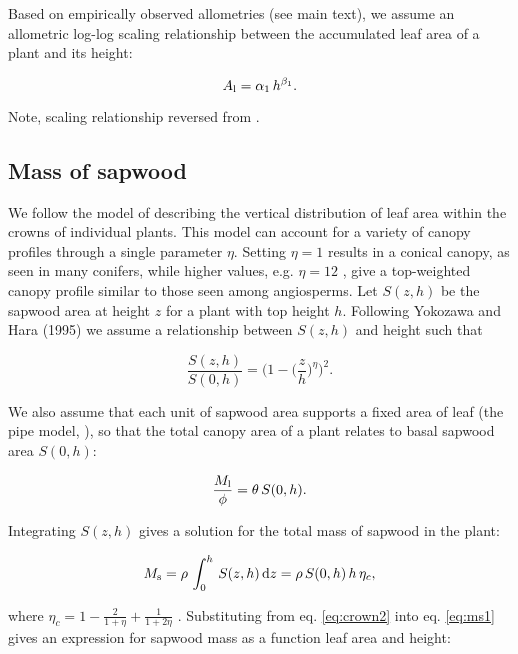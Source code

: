 \documentclass[12pt, a4paper]{article}
\begin{document}
\begin{appendices}
Based on empirically observed allometries (see main text), we assume an
allometric log-log scaling relationship between the accumulated leaf
area of a plant and its height:

\begin{equation}\label{eq:ha}
A_{\rm l}=\alpha_1 \, h^{\beta_1}.
\end{equation}

Note, scaling relationship reversed from \citep{falster-2011}.

\subsection{Mass of sapwood}\label{mass-of-sapwood}

We follow the model of \citep{yokozawa-1995} describing the
vertical distribution of leaf area within the crowns of individual
plants. This model can account for a variety of canopy profiles through
a single parameter $\eta$. Setting $\eta=1$ results in a conical
canopy, as seen in many conifers, while higher values, e.g. $\eta=12$
, give a top-weighted canopy profile similar to those seen among
angiosperms. Let $S(z,h)$ be the sapwood area at height $z$ for a
plant with top height $h$. Following Yokozawa and Hara (1995) we
assume a relationship between $S(z,h)$ and height such that

\begin{equation}\label{eq:crown1}
\frac{S(z,h)}{S(0,h)}= \big(1-\big(\frac{z}{h}\big)^\eta\big)^2.
\end{equation}

We also assume that each unit of sapwood area supports a fixed area of
leaf (the pipe model, \citep{shinozaki-1964}), so that the total
canopy area of a plant relates to basal sapwood area $S(0,h)$:

\begin{equation}\label{eq:crown2}
\frac{M_{\rm l}}{\phi}= \theta \, S(0,h).
\end{equation}

Integrating $S(z,h)$ gives a solution for the total mass of sapwood in
the plant:

\begin{equation}\label{eq:ms1}
M_\textrm{s}=\rho \, \int_0^h \, S(z,h) \, {\rm d}z= \rho \, S(0,h) \, h \, \eta_c, \end{equation}

where
$\eta_c=1-\frac{2}{1+\eta} + \frac{1}{1+2\eta}$ \citep{yokozawa-1995}.
Substituting from eq. \ref{eq:crown2} into eq. \ref{eq:ms1} gives an
expression for sapwood mass as a function leaf area and height:


\end{appendices}
\end{document}
